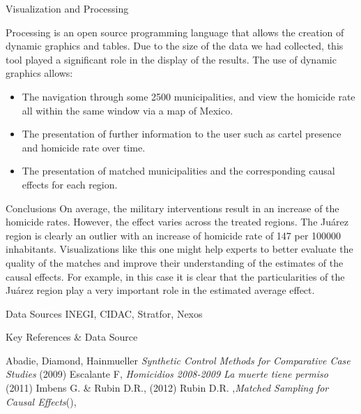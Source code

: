 \documentclass[final]{beamer}
\newlength{\onecolwid}
\begin{document}
\begin{frame}[t]
\begin{columns}[t]
\begin{column}{\onecolwid}
\begin{block}{Visualization and Processing}
\begin{figure}[htdp]
{          }
        \end{figure}
	Processing is an open source programming language that allows the creation of dynamic graphics and tables. Due to the size of the data we had collected, this tool played a significant role in the display of the results. The use of dynamic graphics allows:
        \begin{itemize}
          \item The navigation through some 2500 municipalities, and view the homicide rate all within the same window via a map of Mexico.
          \item The presentation of further information to the user such as cartel presence and homicide rate over time.
          \item The presentation of matched municipalities and the corresponding causal effects for each region.
        \end{itemize}
		
      \end{block}

    

      \begin{block}{Conclusions}
 	On average, the military interventions result in an increase of the homicide rates. However, the effect varies across the treated regions. The Juárez region is clearly an outlier with an increase of homicide rate of 147 per 100000 inhabitants. 
       Visualizations like this one might help experts to better evaluate the quality of the matches and improve their understanding of the estimates of the causal effects. For example, in this case it is clear that the particularities of the Juárez region play a very important role in the estimated average effect. 
      \end{block}

      \begin{block}{Data Sources}
       INEGI, CIDAC, Stratfor, Nexos
      \end{block}

      \begin{block}{Key References \& Data Source}
   
        
        \small{\begin{thebibliography}{99}
           Abadie, Diamond, Hainmueller  \emph{Synthetic Control Methods for Comparative Case Studies} (2009)
           Escalante F, \emph{Homicidios 2008-2009 La muerte tiene permiso} (2011)
           Imbens G. \& Rubin D.R., (2012)
           Rubin D.R. ,\emph{Matched Sampling for Causal Effects}(),
          \end{thebibliography}}
        

\end{block}
\end{column}
\end{columns}
\end{frame}
\end{document}
